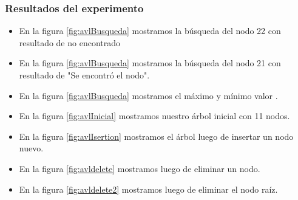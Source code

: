 \documentclass{article}
\begin{document}
         \subsubsection{Resultados del experimento}
         \begin{itemize}
            \item En la figura \ref{fig:avlBusqueda} mostramos la búsqueda del nodo 22 con resultado de no encontrado
           \item En la figura \ref{fig:avlBusqueda} mostramos la búsqueda del nodo 21 con resultado de "Se encontró el nodo".
           \item En la figura \ref{fig:avlBusqueda} mostramos el máximo y  mínimo valor .
           \item En la figura \ref{fig:avlInicial} mostramos nuestro árbol inicial con 11 nodos.
           \item En la figura \ref{fig:avlIsertion} mostramos el árbol luego de insertar un nodo nuevo.
           \item En la figura \ref{fig:avldelete} mostramos luego de eliminar un nodo.
           \item En la figura \ref{fig:avldelete2} mostramos luego de eliminar el nodo raíz.
         \end{itemize}
\end{document}
